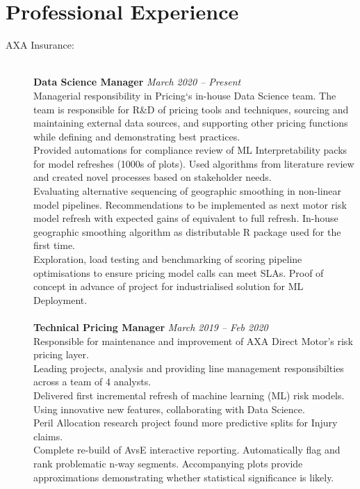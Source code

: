 \documentclass[11pt]{article}
\begin{document}
\section*{Professional Experience}
\begin{description}

\item[AXA Insurance:] \hspace{1mm} \\
\textbf{Data Science Manager} \emph{March 2020 -- Present}\\
\textbullet \quad Managerial responsibility in Pricing`s in-house Data Science team. The team is responsible for R\&D of pricing tools and techniques, sourcing and maintaining external data sources, and supporting other pricing functions while defining and demonstrating best practices. \\
\textbullet \quad Provided automations for compliance review of ML Interpretability packs for model refreshes (1000s of plots). Used algorithms from literature review and created novel processes based on stakeholder needs. \\
\textbullet \quad Evaluating alternative sequencing of geographic smoothing in non-linear model pipelines. Recommendations to be implemented as next motor risk model refresh with expected gains of equivalent to full refresh. In-house geographic smoothing algorithm as distributable R package used for the first time. \\
\textbullet \quad Exploration, load testing and benchmarking of scoring pipeline optimisations to ensure pricing model calls can meet SLAs. Proof of concept in advance of project for industrialised solution for ML Deployment.
\\\\
\textbf{Technical Pricing Manager} \emph{March 2019 -- Feb 2020}\\
\textbullet \quad Responsible for maintenance and improvement of AXA Direct Motor's risk pricing layer.\\
\textbullet \quad Leading projects, analysis and providing line management responsibilties across a team of 4 analysts.\\
\textbullet \quad Delivered first incremental refresh of machine learning (ML) risk models. Using innovative new features, collaborating with Data Science.\\
\textbullet \quad Peril Allocation research project found more predictive splits for Injury claims.\\
\textbullet \quad Complete re-build of AvsE interactive reporting. Automatically flag and rank problematic n-way segments. Accompanying plots provide approximations demonstrating whether statistical significance is likely.

\end{description}
\end{document}
